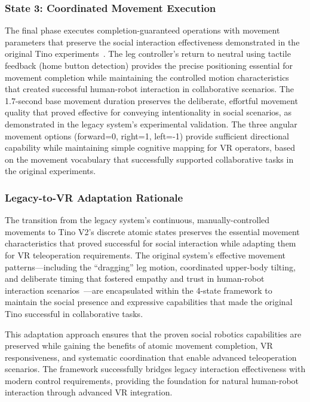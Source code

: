 \subsubsection{State 3: Coordinated Movement Execution}
The final phase executes completion-guaranteed operations with movement parameters that preserve the social interaction effectiveness demonstrated in the original Tino experiments~\cite{cardillo2024thesis}. The leg controller's return to neutral using tactile feedback (home button detection) provides the precise positioning essential for movement completion while maintaining the controlled motion characteristics that created successful human-robot interaction in collaborative scenarios. The 1.7-second base movement duration preserves the deliberate, effortful movement quality that proved effective for conveying intentionality in social scenarios, as demonstrated in the legacy system's experimental validation. The three angular movement options (forward=0, right=1, left=-1) provide sufficient directional capability while maintaining simple cognitive mapping for VR operators, based on the movement vocabulary that successfully supported collaborative tasks in the original experiments.

\subsubsection{Legacy-to-VR Adaptation Rationale}

The transition from the legacy system's continuous, manually-controlled movements to Tino V2's discrete atomic states preserves the essential movement characteristics that proved successful for social interaction while adapting them for VR teleoperation requirements. The original system's effective movement patterns---including the ``dragging'' leg motion, coordinated upper-body tilting, and deliberate timing that fostered empathy and trust in human-robot interaction scenarios~\cite{cardillo2024thesis}---are encapsulated within the 4-state framework to maintain the social presence and expressive capabilities that made the original Tino successful in collaborative tasks.

This adaptation approach ensures that the proven social robotics capabilities are preserved while gaining the benefits of atomic movement completion, VR responsiveness, and systematic coordination that enable advanced teleoperation scenarios. The framework successfully bridges legacy interaction effectiveness with modern control requirements, providing the foundation for natural human-robot interaction through advanced VR integration.


